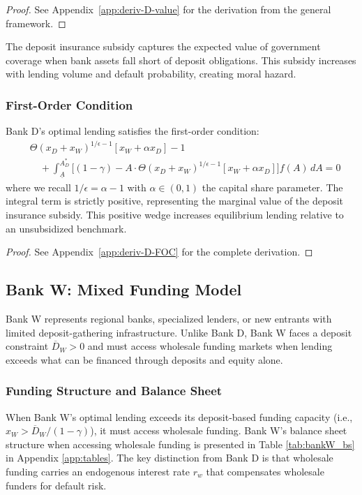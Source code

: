 \documentclass[12pt]{article}
\begin{document}
\begin{proof}
See Appendix~\ref{app:deriv-D-value} for the derivation from the general framework.
\end{proof}

The deposit insurance subsidy captures the expected value of government coverage when bank assets fall short of deposit obligations. This subsidy increases with lending volume and default probability, creating moral hazard.

\subsubsection{First-Order Condition}
\begin{proposition}\label{prop:bank-d-foc}
Bank D's optimal lending satisfies the first-order condition:
\begin{align}
    &\Theta(x_{D}+x_{W})^{1/\epsilon-1}[x_{W}+\alpha x_{D}] - 1 \nonumber \\
    &\quad + \int_{\underline{A}}^{A_{D}^{*}} \big[(1-\gamma) - A \cdot \Theta(x_{D}+x_{W})^{1/\epsilon-1}[x_{W}+\alpha x_{D}] \big] f(A)\,dA = 0
\end{align}
where we recall $1/\epsilon = \alpha - 1$ with $\alpha \in (0,1)$ the capital share parameter. The integral term is strictly positive, representing the marginal value of the deposit insurance subsidy. This positive wedge increases equilibrium lending relative to an unsubsidized benchmark.
\end{proposition}

\begin{proof}
See Appendix~\ref{app:deriv-D-FOC} for the complete derivation.
\end{proof}

\subsection{Bank W: Mixed Funding Model}
Bank W represents regional banks, specialized lenders, or new entrants with limited deposit-gathering infrastructure. Unlike Bank D, Bank W faces a deposit constraint $\overline{D}_{W} > 0$ and must access wholesale funding markets when lending exceeds what can be financed through deposits and equity alone.

\subsubsection{Funding Structure and Balance Sheet}
When Bank W's optimal lending exceeds its deposit-based funding capacity (i.e., $x_{W} > \overline{D}_{W}/(1-\gamma)$), it must access wholesale funding. Bank W's balance sheet structure when accessing wholesale funding is presented in Table \ref{tab:bankW_bs} in Appendix \ref{app:tables}. The key distinction from Bank D is that wholesale funding carries an endogenous interest rate $r_{w}$ that compensates wholesale funders for default risk.
\end{document}
